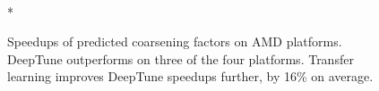 \begin{figure}
	\centering %
	\\*
	\caption[Speedups of predicted thread coarsening factors on AMD]{%
		Speedups of predicted coarsening factors on AMD platforms. DeepTune outperforms \citeauthor{Magni2014} on three of the four platforms. Transfer learning improves DeepTune speedups further, by 16\% on average.%
	}%
	\label{fig:pact-speedup-left}
\end{figure}

